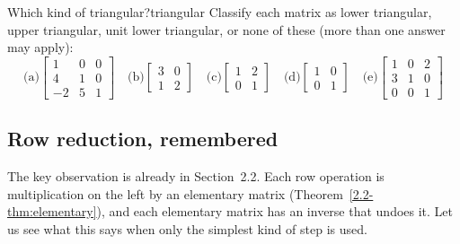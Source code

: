\documentclass[11pt]{article}
\begin{document}
\begin{kc}{Which kind of triangular?}{triangular}
Classify each matrix as lower triangular, upper triangular, unit lower triangular, or none of these (more than one answer may apply):
\[
\text{(a)}\begin{bmatrix}1&0&0\\4&1&0\\-2&5&1\end{bmatrix}\quad
\text{(b)}\begin{bmatrix}3&0\\1&2\end{bmatrix}\quad
\text{(c)}\begin{bmatrix}1&2\\0&1\end{bmatrix}\quad
\text{(d)}\begin{bmatrix}1&0\\0&1\end{bmatrix}\quad
\text{(e)}\begin{bmatrix}1&0&2\\3&1&0\\0&0&1\end{bmatrix}
\]
\end{kc}

\subsection*{Row reduction, remembered}

The key observation is already in Section~2.2. Each row operation is multiplication on the left by an elementary matrix (Theorem~\ref{2.2-thm:elementary}), and each elementary matrix has an inverse that undoes it. Let us see what this says when only the simplest kind of step is used.
\end{document}
